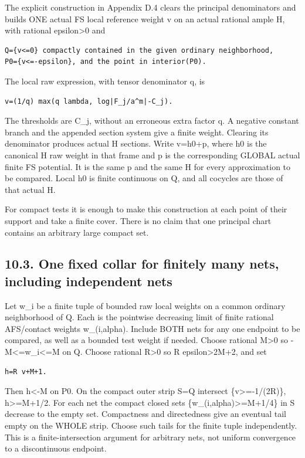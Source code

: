 \documentclass[
  10pt,
]{article}
\begin{document}
The explicit construction in Appendix D.4 clears the principal
denominators and builds ONE actual FS local reference weight v on an
actual rational ample H, with rational epsilon\textgreater0 and

\begin{verbatim}
Q={v<=0} compactly contained in the given ordinary neighborhood,
P0={v<=-epsilon}, and the point in interior(P0).
\end{verbatim}

The local raw expression, with tensor denominator q, is

\begin{verbatim}
v=(1/q) max(q lambda, log|F_j/a^m|-C_j).
\end{verbatim}

The thresholds are C\_j, without an erroneous extra factor q. A negative
constant branch and the appended section system give a finite weight.
Clearing its denominator produces actual H sections. Write v=h0+p, where
h0 is the canonical H raw weight in that frame and p is the
corresponding GLOBAL actual finite FS potential. It is the same p and
the same H for every approximation to be compared. Local h0 is finite
continuous on Q, and all cocycles are those of that actual H.

For compact tests it is enough to make this construction at each point
of their support and take a finite cover. There is no claim that one
principal chart contains an arbitrary large compact set.

\subsection{10.3. One fixed collar for finitely many nets, including
independent
nets}\label{one-fixed-collar-for-finitely-many-nets-including-independent-nets}

Let w\_i be a finite tuple of bounded raw local weights on a common
ordinary neighborhood of Q. Each is the pointwise decreasing limit of
finite rational AFS/contact weights w\_(i,alpha). Include BOTH nets for
any one endpoint to be compared, as well as a bounded test weight if
needed. Choose rational M\textgreater0 so -M\textless=w\_i\textless=M on
Q. Choose rational R\textgreater0 so R epsilon\textgreater2M+2, and set

\begin{verbatim}
h=R v+M+1.
\end{verbatim}

Then h\textless-M on P0. On the compact outer strip S=Q intersect
\{v\textgreater=-1/(2R)\}, h\textgreater=M+1/2. For each net the compact
closed sets \{w\_(i,alpha)\textgreater=M+1/4\} in S decrease to the
empty set. Compactness and directedness give an eventual tail empty on
the WHOLE strip. Choose such tails for the finite tuple independently.
This is a finite-intersection argument for arbitrary nets, not uniform
convergence to a discontinuous endpoint.
\end{document}
